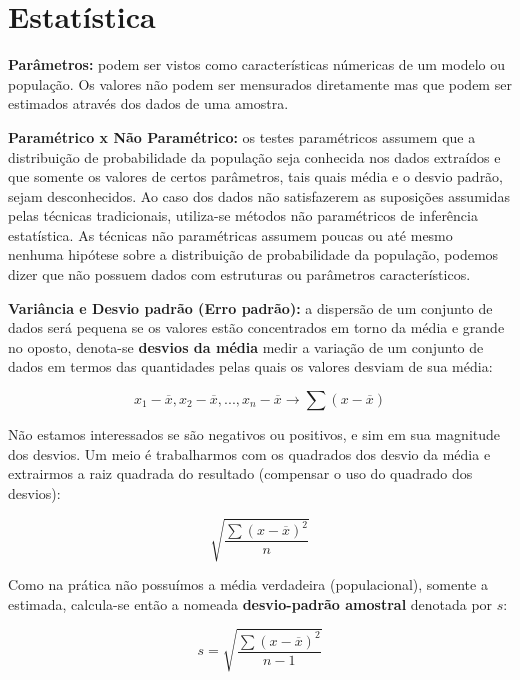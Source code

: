 \documentclass[
  openany]{book}
\begin{document}
\hypertarget{estatuxedstica}{%
\section{Estatística}\label{estatuxedstica}}

\textbf{Parâmetros:} podem ser vistos como características númericas de um modelo ou população. Os valores não podem ser mensurados diretamente mas que podem ser estimados através dos dados de uma amostra.

\textbf{Paramétrico x Não Paramétrico:} os testes paramétricos assumem que a distribuição de probabilidade da população seja conhecida nos dados extraídos e que somente os valores de certos parâmetros, tais quais média e o desvio padrão, sejam desconhecidos. Ao caso dos dados não satisfazerem as suposições assumidas pelas técnicas tradicionais, utiliza-se métodos não paramétricos de inferência estatística. As técnicas não paramétricas assumem poucas ou até mesmo nenhuma hipótese sobre a distribuição de probabilidade da população, podemos dizer que não possuem dados com estruturas ou parâmetros característicos.

\textbf{Variância e Desvio padrão (Erro padrão):} a dispersão de um conjunto de dados será pequena se os valores estão concentrados em torno da média e grande no oposto, denota-se \textbf{desvios da média} medir a variação de um conjunto de dados em termos das quantidades pelas quais os valores desviam de sua média:

\begin{equation}
    x_1-\overline{x},x_2-\overline{x},...,x_n-\overline{x} \rightarrow \sum(x-\overline{x})
        \label{eq:desviomedia}
\end{equation}

Não estamos interessados se são negativos ou positivos, e sim em sua magnitude dos desvios. Um meio é trabalharmos com os quadrados dos desvio da média e extrairmos a raiz quadrada do resultado (compensar o uso do quadrado dos desvios):

\begin{equation}
 \sqrt{\frac{\sum(x-\overline{x})^2}{n}}
     \label{eq:desviomedquad}
\end{equation}

Como na prática não possuímos a média verdadeira (populacional), somente a estimada, calcula-se então a nomeada \textbf{desvio-padrão amostral} denotada por \(s\):

\begin{equation}
s=\sqrt{\frac{\sum(x-\overline{x})^2}{n-1}}
    \label{eq:desviopadrao}
\end{equation}
\end{document}
